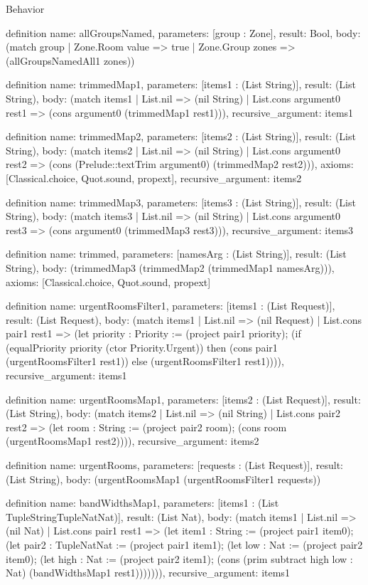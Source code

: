 \begin{lexlean}{Behavior}
\begin{semanticmodule}
definition{
  name: allGroupsNamed,
  parameters: [group : Zone],
  result: Bool,
  body: (match group | Zone.Room value => true | Zone.Group zones => (allGroupsNamedAll1 zones))
}

definition{
  name: trimmedMap1,
  parameters: [items1 : (List String)],
  result: (List String),
  body: (match items1
    | List.nil => (nil String)
    | List.cons argument0 rest1 => (cons argument0 (trimmedMap1 rest1))),
  recursive_argument: items1
}

definition{
  name: trimmedMap2,
  parameters: [items2 : (List String)],
  result: (List String),
  body: (match items2
    | List.nil => (nil String)
    | List.cons argument0 rest2 => (cons (Prelude::textTrim argument0) (trimmedMap2 rest2))),
  axioms: [Classical.choice, Quot.sound, propext],
  recursive_argument: items2
}

definition{
  name: trimmedMap3,
  parameters: [items3 : (List String)],
  result: (List String),
  body: (match items3
    | List.nil => (nil String)
    | List.cons argument0 rest3 => (cons argument0 (trimmedMap3 rest3))),
  recursive_argument: items3
}

definition{
  name: trimmed,
  parameters: [namesArg : (List String)],
  result: (List String),
  body: (trimmedMap3 (trimmedMap2 (trimmedMap1 namesArg))),
  axioms: [Classical.choice, Quot.sound, propext]
}

definition{
  name: urgentRoomsFilter1,
  parameters: [items1 : (List Request)],
  result: (List Request),
  body: (match items1
    | List.nil => (nil Request)
    | List.cons pair1 rest1 => (let priority : Priority := (project pair1 priority); (if (equalPriority priority (ctor Priority.Urgent)) then (cons pair1 (urgentRoomsFilter1 rest1)) else (urgentRoomsFilter1 rest1)))),
  recursive_argument: items1
}

definition{
  name: urgentRoomsMap1,
  parameters: [items2 : (List Request)],
  result: (List String),
  body: (match items2
    | List.nil => (nil String)
    | List.cons pair2 rest2 => (let room : String := (project pair2 room); (cons room (urgentRoomsMap1 rest2)))),
  recursive_argument: items2
}

definition{
  name: urgentRooms,
  parameters: [requests : (List Request)],
  result: (List String),
  body: (urgentRoomsMap1 (urgentRoomsFilter1 requests))
}

definition{
  name: bandWidthsMap1,
  parameters: [items1 : (List TupleStringTupleNatNat)],
  result: (List Nat),
  body: (match items1
    | List.nil => (nil Nat)
    | List.cons pair1 rest1 => (let item1 : String := (project pair1 item0); (let pair2 : TupleNatNat := (project pair1 item1); (let low : Nat := (project pair2 item0); (let high : Nat := (project pair2 item1); (cons (prim subtract high low : Nat) (bandWidthsMap1 rest1))))))),
  recursive_argument: items1
}


\end{semanticmodule}
\end{lexlean}

